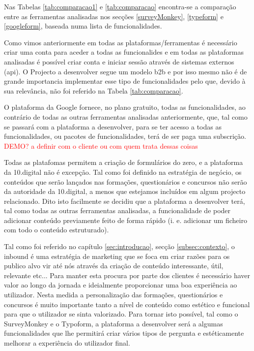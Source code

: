Nas Tabelas \ref{tab:comparacao1} e \ref{tab:comparacao} encontra-se a comparação entre as ferramentas analisadas nos secções \ref{surveyMonkey}, \ref{typeform} e \ref{googleform}, baseada numa lista de funcionalidades.

Como vimos anteriormente em todas as plataformas/ferramentas é necessário criar uma conta para aceder a todas as funcionalides e em todas as plataformas analisadas é possível criar conta e iniciar sessão através de sistemas externos (\acrshort{api}). O Projecto a desenvolver segue um modelo \gls{b2b} e por isso mesmo não é de grande importancia implementar esse tipo de funcionalidades pelo que, devido à sua relevância, não foi referido na Tabela \ref{tab:comparacao}.

O plataforma da Google fornece, no plano gratuito, todas as funcionalidades, ao contrário de todas as outras ferramentas analisadas anteriormente, que, tal como se passará com a plataforma a desenvolver, para se ter acesso a todas as funcionalidades, ou pacotes de funcionalidades, terá de ser paga uma subscrição. \textcolor{red}{DEMO? a definir com o cliente ou com quem trata dessas coisas}

Todas as platafomas permitem a criação de formulários do zero, e a plataforma da 10.digital não é excepção. Tal como foi definido na estratégia de negócio, os conteúdos que serão lançados nas formações, questionários e concursos não serão da autoridade da 10.digital, a menos que estejamos incluídos em algum projecto relacionado. Dito isto facilmente se decidiu que a plataforma a desenvolver terá, tal como todas as outras ferramentas analisadas, a funcionalidade de poder adicionar conteúdo previamente feito de forma rápido (i. e. adicionar um ficheiro com todo o conteúdo estruturado). 


Tal como foi referido no capítulo \ref{sec:introducao}, secção \ref{subsec:contexto}, o inbound é uma estratégia de marketing que se foca em criar razões para os publico alvo vir até nós através da criação de conteúdo interessante, útil, relevante etc... Para manter esta procura por parte dos clientes é necessário haver valor ao longo da jornada e ideialmente proporcionar uma boa experiência ao utilizador. Nesta medida a personalização das formações, questionários e concursos é muito importante tanto a nível de conteúdo como estético e funcional para que o utilizador se sinta valorizado. Para tornar isto possível, tal como o SurveyMonkey e o Typoform, a plataforma a desenvolver será a algumas funcionalidades que lhe permitirá criar vários tipos de pergunta e estéticamente melhorar a experiência do utilizador final.


